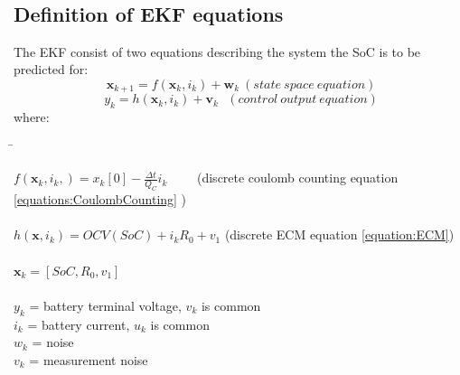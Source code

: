 \
\
\


\subsection{Definition of EKF equations}
\label{System's dynamic model}


%

The EKF consist of two equations describing the system the SoC is to be predicted for:
\begin{equation}
  {\boldsymbol {x}}_{k+1}=f({\boldsymbol {x}}_{k},{{i}}_{k})+ {\boldsymbol {w}}_{k}  \ (state\ space\ equation)  %
\end{equation}
\begin{equation}
 y_{k}=h({\boldsymbol  {x}}_{{k}}, {i}_{k})+{\boldsymbol  {v}}_{{k}}  \ \ \  (control\ output\ equation ) %
\end{equation}
where: 
\begin{tabbing}
\phantom{$v(t)  \  \ \ \  \ $}\= \kill

$f({\boldsymbol {x}}_{k}, {i}_{k},) = {x}_{k}[0] - \frac{\Delta t}{Q_{C}} i_{k} $ \ \ \ \ (discrete coulomb counting equation \ref{equations:CoulombCounting} ) \\\\
$h(\boldsymbol x,i_k) = OCV(SoC) + i_k R_0  +  v_1$ (discrete ECM equation \ref{equation:ECM})\\\\
$\boldsymbol x_{k} = [SoC, R_0, v_1]$ \\\\
$y_{k}$\> =  battery terminal voltage,  $v_{k}$ is common  \\
$i_{k}$\> =   battery current, $u_{k}$ is common  \\
$w_{k}$\> = noise    \\ 
$v_{k}$\> = measurement noise    \\
\end{tabbing}	

